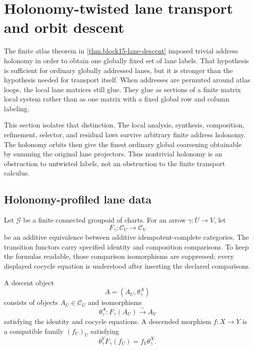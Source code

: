 \clearpage
\section{Holonomy-twisted lane transport and orbit descent}
\label{sec:block16-holonomy-twisted-lane-transport}

The finite atlas theorem in \cref{thm:block15-lane-descent} imposed trivial
address holonomy in order to obtain one globally fixed set of lane labels.  That
hypothesis is sufficient for ordinary globally addressed lanes, but it is
stronger than the hypothesis needed for transport itself.  When addresses are
permuted around atlas loops, the local lane matrices still glue.  They glue as
sections of a finite matrix local system rather than as one matrix with a fixed
global row and column labeling.

This section isolates that distinction.  The local analysis, synthesis,
composition, refinement, selector, and residual laws survive arbitrary finite
address holonomy.  The holonomy orbits then give the finest ordinary global
coarsening obtainable by summing the original lane projectors.  Thus nontrivial
holonomy is an obstruction to untwisted labels, not an obstruction to the
finite transport calculus.

\subsection{Holonomy-profiled lane data}
\label{subsec:block16-holonomy-profiled-data}

Let \(\mathscr G\) be a finite connected groupoid of charts.  For an arrow
\(\gamma:U\to V\), let
\[
 F_\gamma:\mathcal C_U\longrightarrow\mathcal C_V
\]
be an additive equivalence between additive idempotent-complete categories.
The transition functors carry specified identity and composition comparisons.
To keep the formulas readable, those comparison isomorphisms are suppressed;
every displayed cocycle equation is understood after inserting the declared
comparisons.

A descent object
\[
 A=(A_U,\theta^A_\gamma)
\]
consists of objects \(A_U\in\mathcal C_U\) and isomorphisms
\[
 \theta^A_\gamma:F_\gamma(A_U)\xrightarrow{\sim}A_V
\]
satisfying the identity and cocycle equations.  A descended morphism
\(f:X\to Y\) is a compatible family \((f_U)_U\) satisfying
\[
 \theta^Y_\gamma F_\gamma(f_U)=f_V\theta^X_\gamma.
\]

